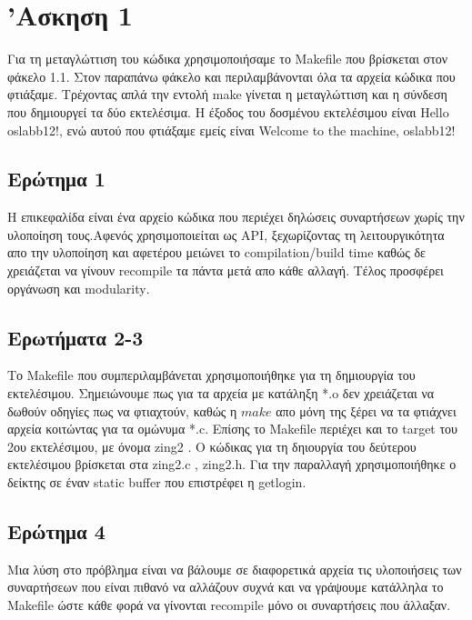 \documentclass[12pt]{article}
\begin{document}
   

\section*{'Ασκηση 1}

Για τη μεταγλώττιση του κώδικα χρησιμοποιήσαμε το \textlatin{Makefile} που βρίσκεται στον φάκελο 1.1. Στον παραπάνω φάκελο και περιλαμβάνονται όλα τα αρχεία κώδικα που φτιάξαμε.  Τρέχοντας απλά την εντολή \textlatin{make}  γίνεται η μεταγλώττιση και η σύνδεση που δημιουργεί τα δύο εκτελέσιμα. Η έξοδος του δοσμένου εκτελέσιμου είναι \textlatin{Hello oslabb12!}, ενώ αυτού που φτιάξαμε εμείς είναι \textlatin{Welcome to the machine, oslabb12!}

\subsection*{Ερώτημα 1}
 Η επικεφαλίδα είναι ένα αρχείο κώδικα που περιέχει δηλώσεις συναρτήσεων
 χωρίς την υλοποίηση τους.Αφενός χρησιμοποιείται ως \textlatin{API}, ξεχωρίζοντας τη λειτουργικότητα απο την υλοποίηση και αφετέρου μειώνει το \textlatin{compilation/build time} καθώς δε χρειάζεται να γίνουν \textlatin{recompile} τα πάντα μετά απο κάθε αλλαγή. Τέλος προσφέρει οργάνωση και \textlatin{modularity}.
 

 \subsection*{Ερωτήματα 2-3} 
 Το \textlatin{Makefile} που συμπεριλαμβάνεται χρησιμοποιήθηκε για τη δημιουργία του εκτελέσιμου.
 Σημειώνουμε πως για τα αρχεία με κατάληξη \textlatin{*.o}  δεν χρειάζεται να δωθούν οδηγίες πως να φτιαχτούν, καθώς η $make$ απο μόνη της ξέρει να τα φτιάχνει αρχεία κοιτώντας για τα ομώνυμα \textlatin{*.c}. Επίσης το \textlatin{Makefile} περιέχει και το \textlatin{target} του 2ου εκτελέσιμου, με όνομα \textlatin{zing2} . Ο κώδικας για τη δηιουργία του δεύτερου εκτελέσιμου βρίσκεται στα \textlatin{zing2.c , zing2.h}. Για την παραλλαγή χρησιμοποιήθηκε ο δείκτης σε έναν \textlatin{static buffer} που επιστρέφει η \textlatin{getlogin}.
 
 
 \subsection*{Ερώτημα 4}
 Μια λύση στο πρόβλημα είναι να βάλουμε σε διαφορετικά αρχεία τις υλοποιήσεις των συναρτήσεων που είναι πιθανό να αλλάζουν συχνά και να γράψουμε κατάλληλα το \textlatin{Makefile} ώστε κάθε φορά να γίνονται  \textlatin{recompile} μόνο οι συναρτήσεις που άλλαξαν.
 
\end{document}
